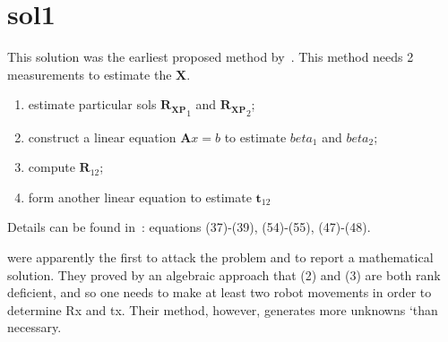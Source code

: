 \section{sol1}
This solution was the earliest proposed method by~\cite{shiu1989calibration}. This method needs 2 measurements to estimate the $\mathbf{X}$. 
\begin{enumerate}
\item estimate particular sols $\mathbf{R_{XP}}_1$ and $\mathbf{R_{XP}}_2$;
\item construct a linear equation $\mathbf{A}x=b$ to estimate $beta_1$ and $beta_2$;
\item compute $\mathbf{R}_{12}$;
\item form another linear equation to estimate $\mathbf{t}_{12}$
\end{enumerate}
Details can be found in~\cite{shiu1989calibration}: equations (37)-(39), (54)-(55), (47)-(48).

\cite{shiu1989calibration} were apparently the
first to attack the problem and to report a mathematical
solution. They proved by an algebraic approach that (2)
and (3) are both rank deficient, and so one needs to
make at least two robot movements in order to
determine Rx and tx. Their method, however,
generates more unknowns ‘than necessary. 

